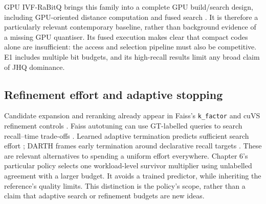 GPU IVF-RaBitQ brings this family into a complete GPU build/search design,
including GPU-oriented distance computation and fused search
\cite{ivfrabitq}. It is therefore a particularly relevant contemporary
baseline, rather than background evidence of a missing GPU quantiser.
Its fused execution makes clear that compact codes alone are insufficient:
the access and selection pipeline must also be competitive. E1 includes
multiple bit budgets, and its high-recall results limit any broad claim
of JHQ dominance.

\subsection{Refinement effort and adaptive stopping}

Candidate expansion and reranking already appear in Faiss's
\texttt{k\_factor} and cuVS refinement controls
\cite{faiss_refine,cuvs_refinement}. Faiss autotuning can use GT-labelled
queries to search recall--time trade-offs \cite{faiss_autotune}. Learned
adaptive termination predicts sufficient search effort
\cite{li_termination}; DARTH frames early termination around declarative
recall targets \cite{darth}. These are relevant alternatives to spending a
uniform effort everywhere. Chapter 6's particular policy selects one
workload-level survivor multiplier using unlabelled agreement with a larger
budget. It avoids a trained predictor, while inheriting the reference's
quality limits. This distinction is the policy's scope, rather than a claim
that adaptive search or refinement budgets are new ideas.
